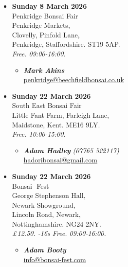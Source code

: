 \begin{itemize}
    \item \textbf{Sunday 8 March 2026}
    \\
    Penkridge Bonsai Fair \\
    Penkridge Markets, \\
    Clovelly, Pinfold Lane, \\
    Penkridge, Staffordshire. ST19 5AP.
    \\
    \emph{Free. 09:00-16:00.}
    \begin{itemize}
        \item \textbf{\emph{Mark Akins}} \\
        \href{mailto:penkridge@beechfieldbonsai.co.uk}{penkridge@beechfieldbonsai.co.uk} 
    \end{itemize}

    \item \textbf{Sunday 22 March 2026}
    \\
    South East Bonsai Fair \\
    Little Fant Farm, Farleigh Lane, \\
    Maidstone, Kent. ME16 9LY.
    \\
    \emph{Free. 10:00-15:00.}
    \begin{itemize}
        \item \textbf{\emph{Adam Hadley}} \emph{(07765 522117)} \\
        \href{mailto:hadoribonsai@gmail.com}{hadoribonsai@gmail.com} 
    \end{itemize}

    \item \textbf{Sunday 22 March 2026}
    \\
    Bonsai -Fest \\
    George Stephenson Hall, \\
    Newark Showground, \\
    Lincoln Road, Newark, \\
    Nottinghamshire. NG24 2NY.
    \\
    \emph{£12.50. -16s Free. 09:00-16:00.}
    \begin{itemize}
        \item \textbf{\emph{Adam Booty}} \\
        \href{mailto:info@bonsai-fest.com}{info@bonsai-fest.com} 
    \end{itemize}

\end{itemize}
\closearticle